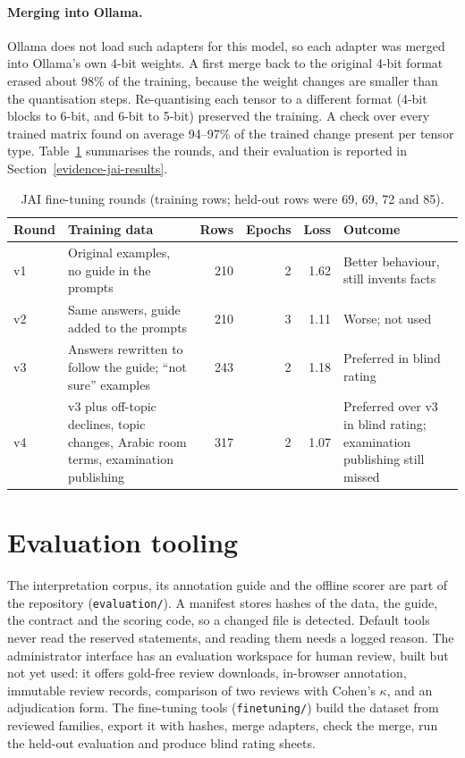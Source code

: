 \paragraph{Merging into Ollama.} Ollama does not load such adapters for this model, so each adapter was merged into Ollama's own 4-bit weights. A first merge back to the original 4-bit format erased about 98\% of the training, because the weight changes are smaller than the quantisation steps. Re-quantising each tensor to a different format (4-bit blocks to 6-bit, and 6-bit to 5-bit) preserved the training. A check over every trained matrix found on average 94--97\% of the trained change present per tensor type. Table~\ref{tab:jai-rounds} summarises the rounds, and their evaluation is reported in Section~\ref{evidence-jai-results}.

\begin{table}[h]
\centering
\small
\begin{tabular}{@{}lp{}rrrp{}@{}}
\toprule
Round & Training data & Rows & Epochs & Loss & Outcome \\
\midrule
v1 & Original examples, no guide in the prompts & 210 & 2 & 1.62 & Better behaviour, still invents facts \\
v2 & Same answers, guide added to the prompts & 210 & 3 & 1.11 & Worse; not used \\
v3 & Answers rewritten to follow the guide; ``not sure'' examples & 243 & 2 & 1.18 & Preferred in blind rating \\
v4 & v3 plus off-topic declines, topic changes, Arabic room terms, examination publishing & 317 & 2 & 1.07 & Preferred over v3 in blind rating; examination publishing still missed \\
\bottomrule
\end{tabular}
\caption{JAI fine-tuning rounds (training rows; held-out rows were 69, 69, 72 and 85).}
\label{tab:jai-rounds}
\end{table}

\section{Evaluation tooling}

The interpretation corpus, its annotation guide and the offline scorer are part of the repository (\texttt{evaluation/}). A manifest stores hashes of the data, the guide, the contract and the scoring code, so a changed file is detected. Default tools never read the reserved statements, and reading them needs a logged reason. The administrator interface has an evaluation workspace for human review, built but not yet used: it offers gold-free review downloads, in-browser annotation, immutable review records, comparison of two reviews with Cohen's $\kappa$, and an adjudication form. The fine-tuning tools (\texttt{finetuning/}) build the dataset from reviewed families, export it with hashes, merge adapters, check the merge, run the held-out evaluation and produce blind rating sheets.

